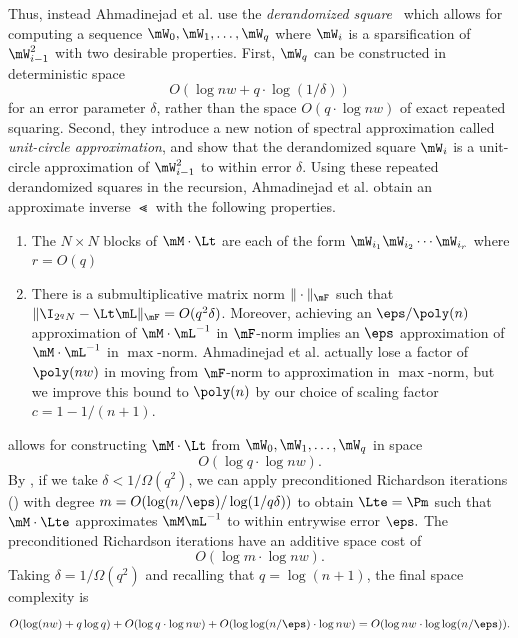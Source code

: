     Thus, instead %
Ahmadinejad  %
et al. use the \emph{derandomized square}~\cite{RozenmanVa05} which allows for computing a sequence
    $\mW_0,\mW_1,\ldots,\mW_q$ where $\mW_i$ is a sparsification of $\mW^2_{i-1}$ with two desirable properties. First, $\mW_q$ can be constructed in
    deterministic space $$O(\log nw+q\cdot \log(1/\delta))$$ for an error parameter $\delta$, rather than the space $O(q\cdot \log nw)$ of exact repeated squaring.  Second, they introduce a new notion of spectral approximation called \emph{unit-circle approximation}, and show that
    the derandomized square
    $\mW_i$ is a unit-circle approximation of $\mW_{i-1}^2$ to within 
    error $\delta$.
    Using these repeated derandomized squares in the recursion, 
%
Ahmadinejad  %
et al. obtain an approximate inverse $\Lt$ with the
%
following properties.  %
    \begin{enumerate}
        \item The $N\times N$ blocks of $\mM\cdot \Lt$ are 
        each of the form $\mW_{i_1}\mW_{i_2}\cdots \mW_{i_r}$
        where $r=O(q)$ \label{itm:degree}
        \item There is a submultiplicative matrix norm $\|\cdot \|_\mF$ such that
        $\|\I_{2^qN}-\Lt \mL\|_\mF = O(q^2\delta)$. Moreover, achieving an $\eps/\poly(n)$ approximation of $\mM\cdot \mL^{-1}$ in $\mF$-norm implies an $\eps$ approximation of $\mM\cdot \mL^{-1}$ in $\max$-norm.   %
Ahmadinejad  %
et al. actually lose a factor of $\poly(nw)$ in moving from $\mF$-norm to approximation in $\max$-norm, but we improve this bound to $\poly(n)$ by our choice of scaling factor $c=1-1/(n+1)$.   
        \label{itm:Fnorm} 
    \end{enumerate}

    
     allows for constructing $\mM\cdot \Lt$ from
    $\mW_0,\mW_1,\ldots,\mW_q$
    in space
    $$O(\log q \cdot \log nw).$$
    By , if we take $\delta<1/\Omega(q^2)$, we 
    can apply 
    preconditioned Richardson iterations ()
    with degree $m=O(\log(n/\eps)/\log(1/q\delta))$ to obtain $\Lte=\Pm$ 
    such that $\mM\cdot \Lte$ approximates $\mM\mL^{-1}$ to within entrywise error $\eps.$
    The preconditioned Richardson iterations have an additive
    space cost of %
    $$O(\log m\cdot \log nw).$$
    Taking $\delta=1/\Omega(q^2)$ and recalling that $q=\log(n+1)$, the final space complexity is
    $$O(\log(nw)+q\log q) + O(\log q\cdot \log nw)+O(\log\log (n/\eps)\cdot \log nw) = O(\log nw \cdot \log\log(n/\eps)).$$
    
